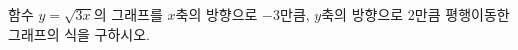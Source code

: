\hspace*{2mm}\begin{minipage}[t]{\dimexpr\linewidth-2mm\relax}\vspace{0pt}
함수 $y=\sqrt{3x}$의 그래프를 $x$축의 방향으로 $-3$만큼, $y$축의 방향으로 $2$만큼 평행이동한 그래프의 식을 구하시오.\end{minipage}

